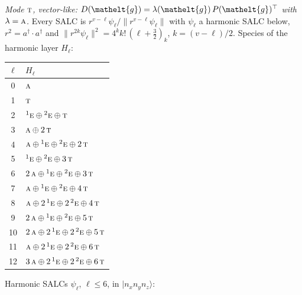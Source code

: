 \documentclass[11pt]{article}
\newcommand{\eltfont}[1]{{\let\sigma\eltsigma\mathelt{#1}}}
\newcommand{\irr}[1]{\text{\normalfont\scshape #1}}
\newcommand{\conjpair}[1]{{}^{#1}}
\newcommand{\elt}[1]{\eltfont{#1}}
\newcommand{\occ}[1]{\lvert #1\rangle}
\newcommand{\gel}{\elt{g}}             %
\newcommand{\gmat}{P(\gel)^{\top}}     %
\begin{document}
\emph{Mode $\irr{t}$, vector-like: $D(\gel)=\lambda(\gel)\,\gmat$ with $\lambda=\irr{a}$.} Every SALC is $r^{v-\ell}\psi_\ell/\lVert r^{v-\ell}\psi_\ell\rVert$ with $\psi_\ell$ a harmonic SALC below, $r^2=a^\dagger\!\cdot a^\dagger$ and $\lVert r^{2k}\psi_\ell\rVert^2=4^kk!\,(\ell+\tfrac32)_k$, $k=(v-\ell)/2$. Species of the harmonic layer $H_\ell$:
\begin{longtable}{c l}\hline $\ell$ & $H_\ell$\\ \hline\endhead
0 & $\irr{a}$\\
1 & $\irr{t}$\\
2 & $\conjpair{1}\irr{e}\oplus \conjpair{2}\irr{e}\oplus \irr{t}$\\
3 & $\irr{a}\oplus 2\,\irr{t}$\\
4 & $\irr{a}\oplus \conjpair{1}\irr{e}\oplus \conjpair{2}\irr{e}\oplus 2\,\irr{t}$\\
5 & $\conjpair{1}\irr{e}\oplus \conjpair{2}\irr{e}\oplus 3\,\irr{t}$\\
6 & $2\,\irr{a}\oplus \conjpair{1}\irr{e}\oplus \conjpair{2}\irr{e}\oplus 3\,\irr{t}$\\
7 & $\irr{a}\oplus \conjpair{1}\irr{e}\oplus \conjpair{2}\irr{e}\oplus 4\,\irr{t}$\\
8 & $\irr{a}\oplus 2\,\conjpair{1}\irr{e}\oplus 2\,\conjpair{2}\irr{e}\oplus 4\,\irr{t}$\\
9 & $2\,\irr{a}\oplus \conjpair{1}\irr{e}\oplus \conjpair{2}\irr{e}\oplus 5\,\irr{t}$\\
10 & $2\,\irr{a}\oplus 2\,\conjpair{1}\irr{e}\oplus 2\,\conjpair{2}\irr{e}\oplus 5\,\irr{t}$\\
11 & $\irr{a}\oplus 2\,\conjpair{1}\irr{e}\oplus 2\,\conjpair{2}\irr{e}\oplus 6\,\irr{t}$\\
12 & $3\,\irr{a}\oplus 2\,\conjpair{1}\irr{e}\oplus 2\,\conjpair{2}\irr{e}\oplus 6\,\irr{t}$\\
\hline\end{longtable}
Harmonic SALCs $\psi_\ell$, $\ell\le6$, in $\occ{n_xn_yn_z}$:
\end{document}
